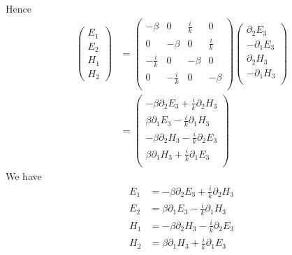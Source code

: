 Hence
\begin{align*}
  \begin{pmatrix}
    E_1 \\ E_2 \\ H_1 \\ H_2
  \end{pmatrix} 
  &= 
  \begin{pmatrix}
    -\beta & 0 & \frac{i}{k} & 0 \\
    0 & -\beta & 0 & \frac{i}{k} \\
    -\frac{i}{k} & 0 & -\beta & 0 \\
    0 & -\frac{i}{k} & 0 & -\beta \\
  \end{pmatrix}
  \begin{pmatrix}
    \partial_2 E_3 \\ -\partial_1 E_3 \\ \partial_2 H_3 \\ -\partial_1 H_3 \\ 
  \end{pmatrix}
  \\ 
  &=
  \begin{pmatrix}
    -\beta\partial_2 E_3 + \frac{i}{k}\partial_2 H_3 \\
    \beta\partial_1 E_3  - \frac{i}{k}\partial_1 H_3 \\
    -\beta\partial_2 H_3  - \frac{i}{k}\partial_2 E_3 \\
    \beta\partial_1 H_3  + \frac{i}{k}\partial_1 E_3 \\
  \end{pmatrix}
\end{align*}
We have
\begin{equation}\label{eq:eh2}
  \begin{split}
    E_1&=-\beta\partial_2 E_3 + \frac{i}{k}\partial_2 H_3 \\
    E_2&=\beta\partial_1 E_3  - \frac{i}{k}\partial_1 H_3 \\
    H_1&=-\beta\partial_2 H_3  - \frac{i}{k}\partial_2 E_3 \\
    H_2&=\beta\partial_1 H_3  + \frac{i}{k}\partial_1 E_3
  \end{split}
\end{equation}

